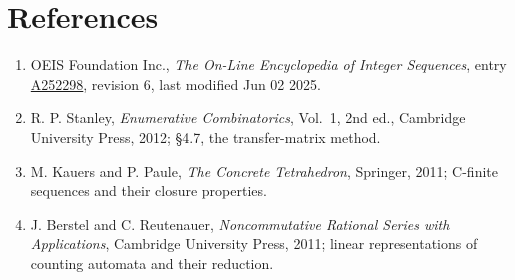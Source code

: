 \documentclass[11pt]{article}
\theoremstyle{definition}
\begin{document}
\section{References}

\begin{enumerate}

\item OEIS Foundation Inc., \emph{The On-Line Encyclopedia of Integer Sequences}, entry \href{https://oeis.org/A252298}{A252298}, revision 6, last modified Jun 02 2025.

\item R. P. Stanley, \emph{Enumerative Combinatorics}, Vol.~1, 2nd ed., Cambridge University Press, 2012; \S4.7, the transfer-matrix method.

\item M. Kauers and P. Paule, \emph{The Concrete Tetrahedron}, Springer, 2011; C-finite sequences and their closure properties.

\item J. Berstel and C. Reutenauer, \emph{Noncommutative Rational Series with Applications}, Cambridge University Press, 2011; linear representations of counting automata and their reduction.

\end{enumerate}
\end{document}
